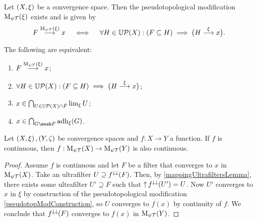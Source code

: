 \begin{proposition} \label{pseudotopModConstruction}
Let $\left( X,\xi \right)$ be a convergence space. Then the pseudotopological modification $\operatorname{M_{\psi\mathcal{T}}}(\xi)$ exists and is given by
\[ F \overset{\operatorname{M_{\psi\mathcal{T}}}(\xi)}{\longrightarrow} x \quad\iff\quad \forall H\in \operatorname{\mathbb{U}\mathcal{P}}(X): (F\subseteq H) \implies \big(H \overset{\xi}{\longrightarrow} x\big). \]
\end{proposition}

\begin{proposition}
The following are equivalent:
\begin{enumerate}
\item $F \overset{\operatorname{M_{\psi\mathcal{T}}}(\xi)}{\longrightarrow} x$;
\item $\forall H\in \operatorname{\mathbb{U}\mathcal{P}}(X): (F\subseteq H) \implies \big(H \overset{\xi}{\longrightarrow} x\big)$;
\item $x\in \bigcap_{U\in \operatorname{\mathbb{U}\mathcal{P}}(X)\cap \dot{F}}\lim_\xi U$;
\item $x\in \bigcap_{G\mesh F}\adh_\xi(G)$.
\end{enumerate}
\end{proposition}

\begin{proposition} \label{pseudotopModFunctorial}
Let $\left( X, \xi \right), \left( Y,\zeta \right)$ be convergence spaces and $f: X\to Y$ a function. If $f$ is continuous, then $f: \operatorname{M_{\psi\mathcal{T}}}(X)\to \operatorname{M_{\psi\mathcal{T}}}(Y)$ is also continuous.
\end{proposition}
\begin{proof}
Assume $f$ is continuous and let $F$ be a filter that converges to $x$ in $\operatorname{M_{\psi\mathcal{T}}}(X)$. Take an ultrafilter $U \supseteq f^{\downarrow\downarrow}(F)$. Then, by \ref{mappingUltrafiltersLemma}, there exists some ultrafilter $U'\supseteq F$ such that $\operatorname{\uparrow} f^{\downarrow\downarrow}(U') = U$. Now $U'$ converges to $x$ in $\xi$ by construction of the pseudotopological modification \ref{pseudotopModConstruction}, so $U$ converges to $f(x)$ by continuity of $f$. We conclude that $f^{\downarrow\downarrow}(F)$ converges to $f(x)$ in $\operatorname{M_{\psi\mathcal{T}}}(Y)$.
\end{proof}

